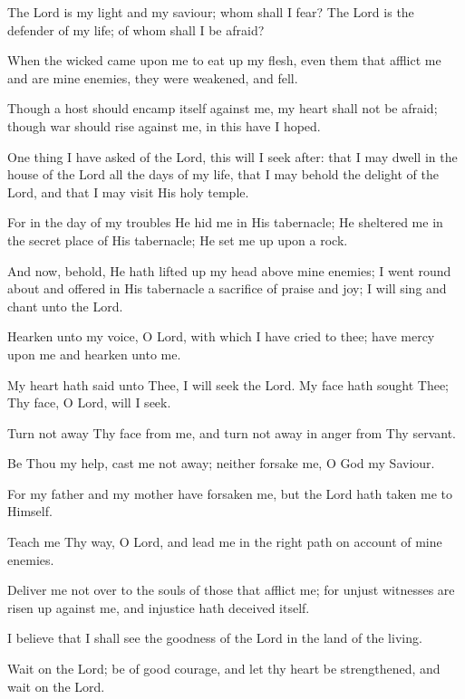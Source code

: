 The Lord is my light and my saviour; whom shall I fear? The Lord is the defender of my life; of whom shall I be afraid?

When the wicked came upon me to eat up my flesh, even them that afflict me and are mine enemies, they were weakened, and fell.

Though a host should encamp itself against me, my heart shall not be afraid; though war should rise against me, in this have I hoped.

One thing I have asked of the Lord, this will I seek after: that I may dwell in the house of the Lord all the days of my life, that I may behold the delight of the Lord, and that I may visit His holy temple.

For in the day of my troubles He hid me in His tabernacle; He sheltered me in the secret place of His tabernacle; He set me up upon a rock.

And now, behold, He hath lifted up my head above mine enemies; I went round about and offered in His tabernacle a sacrifice of praise and joy; I will sing and chant unto the Lord.

Hearken unto my voice, O Lord, with which I have cried to thee; have mercy upon me and hearken unto me.

My heart hath said unto Thee, I will seek the Lord. My face hath sought Thee; Thy face, O Lord, will I seek.

Turn not away Thy face from me, and turn not away in anger from Thy servant.

Be Thou my help, cast me not away; neither forsake me, O God my Saviour.

For my father and my mother have forsaken me, but the Lord hath taken me to Himself.

Teach me Thy way, O Lord, and lead me in the right path on account of mine enemies.

Deliver me not over to the souls of those that afflict me; for unjust witnesses are risen up against me, and injustice hath deceived itself.

I believe that I shall see the goodness of the Lord in the land of the living.

Wait on the Lord; be of good courage, and let thy heart be strengthened, and wait on the Lord.

